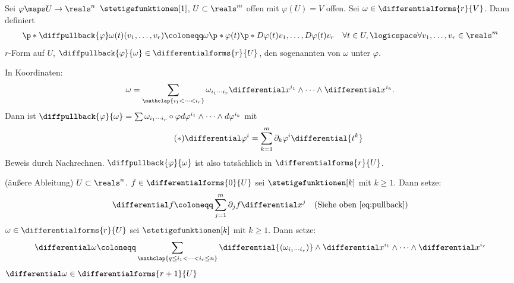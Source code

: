\begin{definition} \label{pullback}
  Sei \( \varphi\maps U\to\reals^n\) \(\stetigefunktionen[1]\), \( U\subset\reals^m \) offen mit \( \varphi(U)=V \) offen.
  Sei \( \omega\in\differentialforms{r}{V} \). Dann definiert 
  \begin{gather*}
      \p*{ \diffpullback{\varphi} \omega }(t)(v_1,\dotsc ,v_r)\coloneqq \omega\p*{ \varphi(t) }
      \p*{ D\varphi(t)v_1,\dotsc ,D\varphi(t)v_r }\quad  \forall t\in U,\logicspace  \forall v_1,\dotsc ,v_r\in\reals^m
  \end{gather*}
  \( r \)-Form auf \( U \), \( \diffpullback{\varphi}{\omega}\in\differentialforms{r}{U} \), den sogenannten    von \( \omega \) unter \( \varphi \).

  In Koordinaten: 
  \begin{equation*}
      \omega=\sum_{\mathclap{i_1<\dotsb <i_r}} \omega_{i_1\cdots i_r}\differential x^{i_1}\wedge\dotsb \wedge \differential x^{i_k}.
  \end{equation*}
  Dann ist \( \diffpullback{\varphi}{\omega}=\sum \omega_{i_1\cdots i_r}\circ\varphi d\varphi^{i_1}\wedge\dotsb \wedge d\varphi^{i_k}  \) mit 
  \begin{equation}
      \tag{\( * \)} \label{eq:pullback}
      \differential\varphi^i=\sum_{k=1}^{m}\partial_k\varphi^i \differential{t^k}
  \end{equation}
  Beweis durch Nachrechnen. \( \diffpullback{\varphi}{\omega} \) ist also tatsächlich in \( \differentialforms{r}{U} \).
\end{definition}

\begin{definition}
   (äußere Ableitung) \( U\subset\reals^n \).
  \( f\in\differentialforms{0}{U} \) sei \( \stetigefunktionen[k] \) mit \( k\geq 1 \). Dann setze:
  \begin{equation*}
      \differential f \coloneqq \sum_{j=1}^{m}\partial_j f\differential x^j \quad (\text{Siehe oben \eqref{eq:pullback}})
  \end{equation*}
  \( \omega\in\differentialforms{r}{U} \) sei \( \stetigefunktionen[k] \) mit \( k\geq 1 \). Dann setze:
  \begin{equation*}
      \differential \omega\coloneqq \sum_{\mathclap{q \leq i_1<\dotsb <i_r \leq n}} \differential{(\omega_{i_1\dotsm i_r})}\wedge \differential x^{i_1}\wedge\dotsb \wedge \differential x^{i_r}
  \end{equation*}
  \( \differential \omega\in\differentialforms{r+1}{U} \)
\end{definition}

